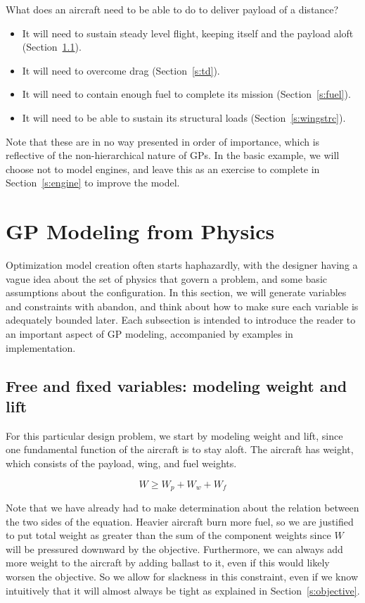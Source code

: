 What does an aircraft need to be able to do to deliver payload of a distance?
\begin{itemize}
	\item It will need to sustain steady
    level flight, keeping itself and the payload aloft (Section~\ref{s:wl}).
    \item It will need to overcome drag (Section~\ref{s:td}).
	\item It will need to contain enough fuel to complete its mission
        (Section~\ref{s:fuel}).
	\item It will need to be able to sustain its structural loads (Section~\ref{s:wingstrc}).
\end{itemize}

Note that these are in no way presented in order of importance, which is reflective
of the non-hierarchical nature of \gls{GP}s.
In the basic example, we will choose not to model engines,
and leave this as an exercise
to complete in Section~\ref{s:engine} to improve the model.

\section{GP Modeling from Physics}

Optimization model creation often starts haphazardly, with the designer having a
vague idea about the set of physics that govern a problem, and some basic
assumptions about the configuration. In this section, we will
generate variables and constraints with abandon, and think about how to make
sure each variable is adequately bounded later. Each subsection is intended
to introduce the reader to an important aspect of \gls{GP} modeling,
accompanied by examples in implementation.

\subsection{Free and fixed variables: modeling weight and lift}
\label{s:wl}

For this particular design problem, we start by modeling
weight and lift, since one fundamental function of the aircraft is to stay aloft.
The aircraft has weight, which consists of the payload, wing, and fuel weights. 

\begin{equation}
    W \geq W_p + W_w + W_f
\end{equation}

Note that we have already had to make determination about the relation between
the two sides of the equation. Heavier aircraft burn more fuel, so we are justified
to put total weight as greater than the sum of the component weights since
$W$ will be pressured downward by the objective. Furthermore, we can
always add more weight to the aircraft by adding ballast to it, even if this would likely
worsen the objective. So we allow for slackness in this constraint, even
if we know intuitively that it will almost always be tight as explained in Section~\ref{s:objective}.

